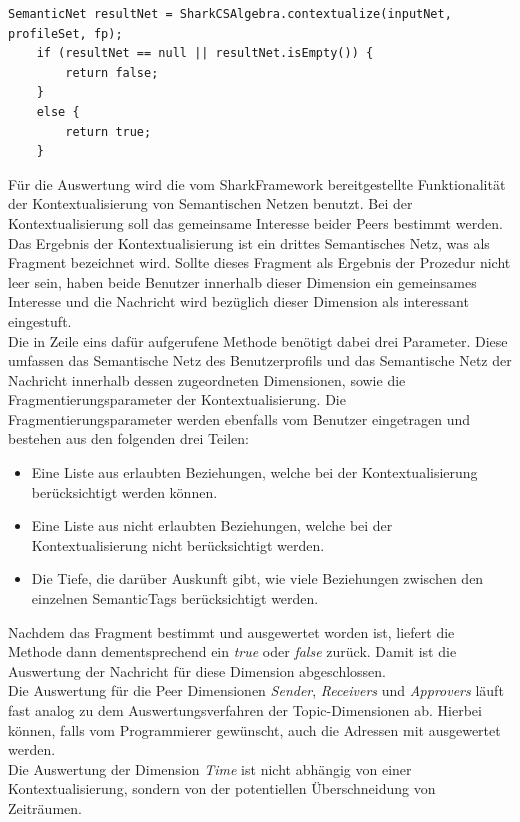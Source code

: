 \lstset{language=Java, caption=Auswertung des Semantischen Netzes (Auszug), label=DescriptiveLabel, numbers=left, numbersep=1em, breaklines=true, basicstyle=\small}
\begin{lstlisting}
SemanticNet resultNet = SharkCSAlgebra.contextualize(inputNet, profileSet, fp);
	if (resultNet == null || resultNet.isEmpty()) {
		return false;
	}
	else {
		return true;
	}
\end{lstlisting}
Für die Auswertung wird die vom SharkFramework bereitgestellte Funktionalität der Kontextualisierung von Semantischen Netzen benutzt. Bei der Kontextualisierung soll das gemeinsame Interesse beider Peers bestimmt werden. Das Ergebnis der Kontextualisierung ist ein drittes Semantisches Netz, was als Fragment bezeichnet wird. Sollte dieses Fragment als Ergebnis der Prozedur nicht leer sein, haben beide Benutzer innerhalb dieser Dimension ein gemeinsames Interesse und die Nachricht wird bezüglich dieser Dimension als interessant eingestuft.
\\Die in Zeile eins dafür aufgerufene Methode benötigt dabei drei Parameter. Diese umfassen das Semantische Netz des Benutzerprofils und das Semantische Netz der Nachricht innerhalb dessen zugeordneten Dimensionen, sowie die Fragmentierungsparameter der Kontextualisierung. Die Fragmentierungsparameter werden ebenfalls vom Benutzer eingetragen und bestehen aus den folgenden drei Teilen:
\begin{itemize}
	\item Eine Liste aus erlaubten Beziehungen, welche bei der Kontextualisierung berücksichtigt werden können.
	\item Eine Liste aus nicht erlaubten Beziehungen, welche bei der Kontextualisierung nicht berücksichtigt werden.
	\item Die Tiefe, die darüber Auskunft gibt, wie viele Beziehungen zwischen den einzelnen SemanticTags berücksichtigt werden.
\end{itemize}
Nachdem das Fragment bestimmt und ausgewertet worden ist, liefert die Methode dann dementsprechend ein \textit{true} oder \textit{false} zurück. Damit ist die Auswertung der Nachricht für diese Dimension abgeschlossen.
\\Die Auswertung für die Peer Dimensionen \textit{Sender}, \textit{Receivers} und \textit{Approvers} läuft fast analog zu dem Auswertungsverfahren der Topic-Dimensionen ab. Hierbei können, falls vom Programmierer gewünscht, auch die Adressen mit ausgewertet werden. 
\\Die Auswertung der Dimension \textit{Time} ist nicht abhängig von einer Kontextualisierung, sondern von der potentiellen Überschneidung von Zeiträumen.\newline

